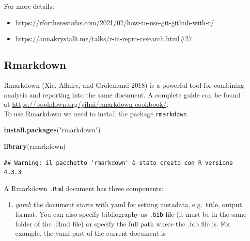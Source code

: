\documentclass[
]{article}
\newenvironment{Shaded}{\begin{snugshade}}{\end{snugshade}}
\newcommand{\FunctionTok}[1]{\textcolor[rgb]{0.13,0.29,0.53}{\textbf{#1}}}
\newcommand{\NormalTok}[1]{#1}
\newcommand{\StringTok}[1]{\textcolor[rgb]{0.31,0.60,0.02}{#1}}
\providecommand{\tightlist}{%
  \setlength{\itemsep}{0pt}\setlength{\parskip}{0pt}}
\begin{document}
For more details:

\begin{itemize}
\tightlist
\item
  \url{https://rfortherestofus.com/2021/02/how-to-use-git-github-with-r/}
\item
  \url{https://annakrystalli.me/talks/r-in-repro-research.html\#27}
\end{itemize}

\hypertarget{rmarkdown}{%
\subsection{Rmarkdown}\label{rmarkdown}}

Rmarkdown (Xie, Allaire, and Grolemund 2018) is a powerful tool for
combining analysis and reporting into the same document. A complete
guide can be found at
\url{https://bookdown.org/yihui/rmarkdown-cookbook/}.\\
To use Rmarkdown we need to install the package \texttt{rmarkdown}

\begin{Shaded}
\begin{Highlighting}[]
\FunctionTok{install.packages}\NormalTok{(}\StringTok{"rmarkdown"}\NormalTok{)}
\end{Highlighting}
\end{Shaded}

\begin{Shaded}
\begin{Highlighting}[]
\FunctionTok{library}\NormalTok{(rmarkdown)}
\end{Highlighting}
\end{Shaded}

\begin{verbatim}
## Warning: il pacchetto 'rmarkdown' è stato creato con R versione 4.3.3
\end{verbatim}

A Rmarkdown \texttt{.Rmd} document has three components:

\begin{enumerate}
\def\labelenumi{\arabic{enumi}.}
\tightlist
\item
  \emph{yaml}: the document starts with yaml for setting metadata,
  e.g.~title, output format. You can also specify bibliography as
  \texttt{.bib} file (it must be in the same folder of the .Rmd file) or
  specify the full path where the .bib file is. For example, the yaml
  part of the current document is
\end{enumerate}
\end{document}
